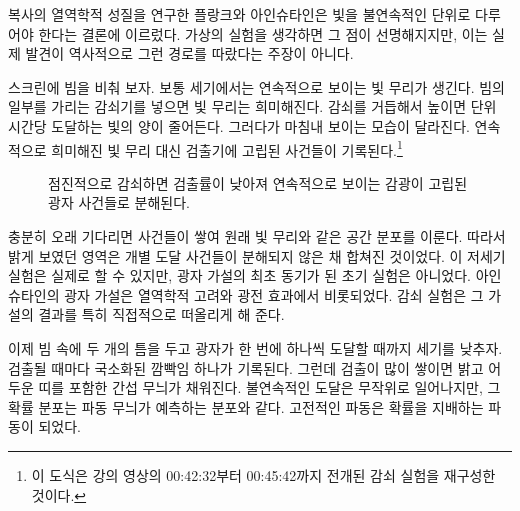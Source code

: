 복사의 열역학적 성질을 연구한 플랑크와 아인슈타인은 빛을 불연속적인 단위로 다루어야 한다는 결론에 이르렀다. 가상의 실험을 생각하면 그 점이 선명해지지만, 이는 실제 발견이 역사적으로 그런 경로를 따랐다는 주장이 아니다.

스크린에 빔을 비춰 보자. 보통 세기에서는 연속적으로 보이는 빛 무리가 생긴다. 빔의 일부를 가리는 감쇠기를 넣으면 빛 무리는 희미해진다. 감쇠를 거듭해서 높이면 단위 시간당 도달하는 빛의 양이 줄어든다. 그러다가 마침내 보이는 모습이 달라진다. 연속적으로 희미해진 빛 무리 대신 검출기에 고립된 사건들이 기록된다.\footnote{이 도식은 강의 영상의 00:42:32부터 00:45:42까지 전개된 감쇠 실험을 재구성한 것이다.}

\begin{figure}[h]\centering
{}\caption{점진적으로 감쇠하면 검출률이 낮아져 연속적으로 보이는 감광이 고립된 광자 사건들로 분해된다.}\end{figure}

충분히 오래 기다리면 사건들이 쌓여 원래 빛 무리와 같은 공간 분포를 이룬다. 따라서 밝게 보였던 영역은 개별 도달 사건들이 분해되지 않은 채 합쳐진 것이었다. 이 저세기 실험은 실제로 할 수 있지만, 광자 가설의 최초 동기가 된 초기 실험은 아니었다. 아인슈타인의 광자 가설은 열역학적 고려와 광전 효과에서 비롯되었다. 감쇠 실험은 그 가설의 결과를 특히 직접적으로 떠올리게 해 준다.

이제 빔 속에 두 개의 틈을 두고 광자가 한 번에 하나씩 도달할 때까지 세기를 낮추자. 검출될 때마다 국소화된 깜빡임 하나가 기록된다. 그런데 검출이 많이 쌓이면 밝고 어두운 띠를 포함한 간섭 무늬가 채워진다. 불연속적인 도달은 무작위로 일어나지만, 그 확률 분포는 파동 무늬가 예측하는 분포와 같다. 고전적인 파동은 확률을 지배하는 파동이 되었다.

